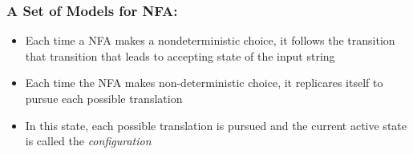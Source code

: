 \documentclass[20pt]{article}
\begin{document}
\begin{itemize}
\begin{itemize}
                                  \end{itemize}
                        \subsubsection*{A Set of Models for NFA: }
                                  \begin{itemize}
                                      \item Each time a NFA makes a nondeterministic choice, it follows the transition  that transition that leads to accepting state of the input string
                                      \item Each time the NFA makes non-deterministic choice, it replicares itself to pursue each possible translation
                                      \item In this state, each possible translation is pursued and the current active state is called the \textit{configuration}
                                  \end{itemize}

\end{itemize}
\end{document}
